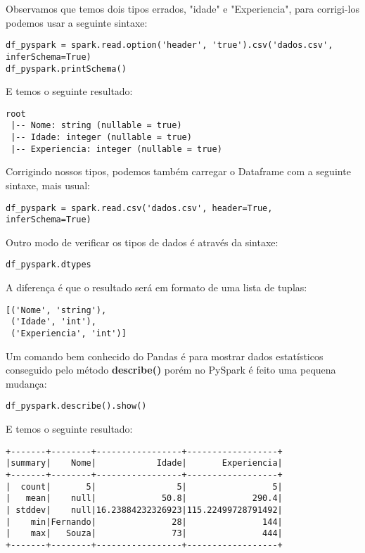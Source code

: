 Observamos que temos dois tipos errados, "idade" e "Experiencia", para corrigi-los podemos usar a seguinte sintaxe:
\begin{lstlisting}[]
df_pyspark = spark.read.option('header', 'true').csv('dados.csv', inferSchema=True)
df_pyspark.printSchema()
\end{lstlisting}

E temos o seguinte resultado: \vspace{-1.5em}
\begin{verbatim}
root
 |-- Nome: string (nullable = true)
 |-- Idade: integer (nullable = true)
 |-- Experiencia: integer (nullable = true)
\end{verbatim}

Corrigindo nossos tipos, podemos também carregar o Dataframe com a seguinte sintaxe, mais usual:
\begin{lstlisting}[]
df_pyspark = spark.read.csv('dados.csv', header=True, inferSchema=True)
\end{lstlisting}

Outro modo de verificar os tipos de dados é através da sintaxe:
\begin{lstlisting}[]
df_pyspark.dtypes
\end{lstlisting}

A diferença é que o resultado será em formato de uma lista de tuplas: \vspace{-1.5em}
\begin{verbatim}
[('Nome', 'string'),
 ('Idade', 'int'),
 ('Experiencia', 'int')]
\end{verbatim}

Um comando bem conhecido do Pandas é para mostrar dados estatísticos conseguido pelo método \textbf{describe()} porém no PySpark é feito uma pequena mudança:
\begin{lstlisting}[]
df_pyspark.describe().show()
\end{lstlisting}

E temos o seguinte resultado: \vspace{-1.5em}
\begin{verbatim}
+-------+--------+-----------------+------------------+
|summary|    Nome|            Idade|       Experiencia|
+-------+--------+-----------------+------------------+
|  count|       5|                5|                 5|
|   mean|    null|             50.8|             290.4|
| stddev|    null|16.23884232326923|115.22499728791492|
|    min|Fernando|               28|               144|
|    max|   Souza|               73|               444|
+-------+--------+-----------------+------------------+
\end{verbatim}

